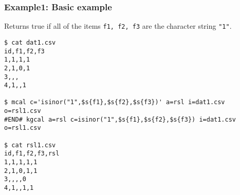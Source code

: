 
\subsubsection*{Example1: Basic example}
Returns true if all of the items \verb|f1, f2, f3| are the character string \verb|"1"|.

\begin{Verbatim}[baselinestretch=0.7,frame=single]
$ cat dat1.csv
id,f1,f2,f3
1,1,1,1
2,1,0,1
3,,,
4,1,,1

$ mcal c='isinor("1",$s{f1},$s{f2},$s{f3})' a=rsl i=dat1.csv o=rsl1.csv
#END# kgcal a=rsl c=isinor("1",$s{f1},$s{f2},$s{f3}) i=dat1.csv o=rsl1.csv

$ cat rsl1.csv
id,f1,f2,f3,rsl
1,1,1,1,1
2,1,0,1,1
3,,,,0
4,1,,1,1
\end{Verbatim}
